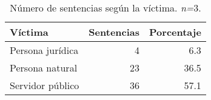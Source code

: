\begin{table}[H]
\centering
\caption{Número de sentencias según la víctima. \textit{n=}3.} 
\label{tab:victima}
\begin{tabular}{lrr}
  \hline
Víctima & Sentencias & Porcentaje \\ 
  \hline
Persona jurídica &  4 & 6.3 \\ 
  Persona natural & 23 & 36.5 \\ 
  Servidor público & 36 & 57.1 \\ 
   \hline
\end{tabular}
\end{table}
